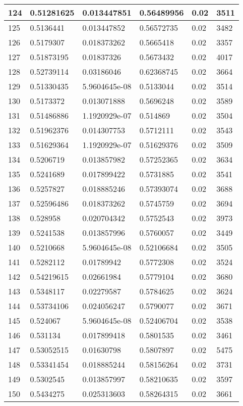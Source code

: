 \begin{longtable}{|l|l|l|l|l|l|}
124 & 0.51281625 & 0.013447851 & 0.56489956 & 0.02 & 3511 \\ \hline 
125 & 0.5136441 & 0.013447852 & 0.56572735 & 0.02 & 3482 \\ \hline 
126 & 0.5179307 & 0.018373262 & 0.5665418 & 0.02 & 3357 \\ \hline 
127 & 0.51873195 & 0.01837326 & 0.5673432 & 0.02 & 4017 \\ \hline 
128 & 0.52739114 & 0.03186046 & 0.62368745 & 0.02 & 3664 \\ \hline 
129 & 0.51330435 & 5.9604645e-08 & 0.5133044 & 0.02 & 3514 \\ \hline 
130 & 0.5173372 & 0.013071888 & 0.5696248 & 0.02 & 3589 \\ \hline 
131 & 0.51486886 & 1.1920929e-07 & 0.514869 & 0.02 & 3504 \\ \hline 
132 & 0.51962376 & 0.014307753 & 0.5712111 & 0.02 & 3543 \\ \hline 
133 & 0.51629364 & 1.1920929e-07 & 0.51629376 & 0.02 & 3509 \\ \hline 
134 & 0.5206719 & 0.013857982 & 0.57252365 & 0.02 & 3634 \\ \hline 
135 & 0.5241689 & 0.017899422 & 0.5731885 & 0.02 & 3541 \\ \hline 
136 & 0.5257827 & 0.018885246 & 0.57393074 & 0.02 & 3688 \\ \hline 
137 & 0.52596486 & 0.018373262 & 0.5745759 & 0.02 & 3694 \\ \hline 
138 & 0.528958 & 0.020704342 & 0.5752543 & 0.02 & 3973 \\ \hline 
139 & 0.5241538 & 0.013857996 & 0.5760057 & 0.02 & 3449 \\ \hline 
140 & 0.5210668 & 5.9604645e-08 & 0.52106684 & 0.02 & 3505 \\ \hline 
141 & 0.5282112 & 0.01789942 & 0.5772308 & 0.02 & 3524 \\ \hline 
142 & 0.54219615 & 0.02661984 & 0.5779104 & 0.02 & 3680 \\ \hline 
143 & 0.5348117 & 0.02279587 & 0.5784625 & 0.02 & 3624 \\ \hline 
144 & 0.53734106 & 0.024056247 & 0.5790077 & 0.02 & 3671 \\ \hline 
145 & 0.524067 & 5.9604645e-08 & 0.52406704 & 0.02 & 3538 \\ \hline 
146 & 0.531134 & 0.017899418 & 0.5801535 & 0.02 & 3461 \\ \hline 
147 & 0.53052515 & 0.01630798 & 0.5807897 & 0.02 & 5475 \\ \hline 
148 & 0.53341454 & 0.018885244 & 0.58156264 & 0.02 & 3731 \\ \hline 
149 & 0.5302545 & 0.013857997 & 0.58210635 & 0.02 & 3597 \\ \hline 
150 & 0.5434275 & 0.025313603 & 0.58264315 & 0.02 & 3661 \\ \hline 
\end{longtable}